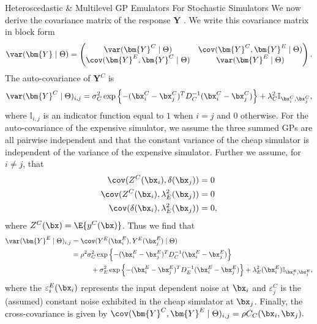 \begin{chapter}{Heteroscedastic \& Multilevel GP Emulators For Stochastic Simulators\label{Ch:Hetsml}}
We now derive the covariance matrix of the response $\bm{Y}$ . We write this covariance matrix in block form
\begin{equation}
  \var(\bm{Y} \mid \Theta) = \begin{pmatrix}
  \var(\bm{Y}^C\mid \Theta) & \cov(\bm{Y}^C, \bm{Y}^E\mid \Theta) \\
  \cov(\bm{Y}^E, \bm{Y}^C\mid \Theta) & \var(\bm{Y}^E\mid \Theta)
  \end{pmatrix}.
\end{equation}
The auto-covariance of $\bm{Y}^C$ is
\begin{equation*}
\var(\bm{Y}^C\mid \Theta)_{i,j} = \sigma^2_C \exp \left\{ -(\bx^C_i - \bx^C_j)^T D^{-1}_C (\bx^C_i - \bx^C_j)\right\} + \lambda_C^2 \mathbb{I}_{\bx^C_i, \bx^C_j},
\end{equation*}
\noindent where $\mathbb{I}_{i, j}$ is an indicator function equal to $1$ when $i=j$ and $0$ otherwise. For the auto-covariance of the expensive simulator, we assume the three summed GPs are all pairwise independent and that the constant variance of the cheap simulator is independent of the variance of the expensive simulator. Further we assume, for $i \neq j$, that
\begin{align}
\cov(Z^C(\bx_i), \delta(\bx_j)) &= 0 \\
\cov(Z^C(\bx_i), \lambda^2_E(\bx_j)) &= 0 \\
\cov(\delta(\bx_i), \lambda^2_E(\bx_j)) &= 0,
\end{align}
where $Z^C(\bx)=\E\{ y^C(\bx) \}$. Thus we find that
\begin{align}
\var(\bm{Y}^E\mid \Theta)_{i,j} & = \cov(Y^E(\bx^E_i), Y^E(\bx^E_j)\mid \Theta)\\
& = \rho^2 \sigma_C^2 \exp\left\{ -(\bx^E_i - \bx^E_j)^T D^{-1}_C (\bx^E_i - \bx^E_j) \right\} \nonumber\\
& \hspace{1cm} + \sigma_E^2 \exp\left\{ -(\bx^E_i - \bx^E_j)^T D^{-1}_E (\bx^E_i - \bx^E_j) \right\}  + \lambda^2_E(\bx^E_i)\mathbb{I}_{\bx^E_i, \bx^E_j},
\end{align}
where the $\varepsilon^E_i(\bx_i)$ represents the input dependent noise at $\bx_i$ and $\varepsilon^C_j$ is the (assumed) constant noise exhibited in the cheap simulator at $\bx_j$. Finally, the cross-covariance is given by $\cov(\bm{Y}^C, \bm{Y}^E \mid \Theta)_{i,j}  = \rho C_C(\bx_i, \bx_j).$


\end{chapter}
